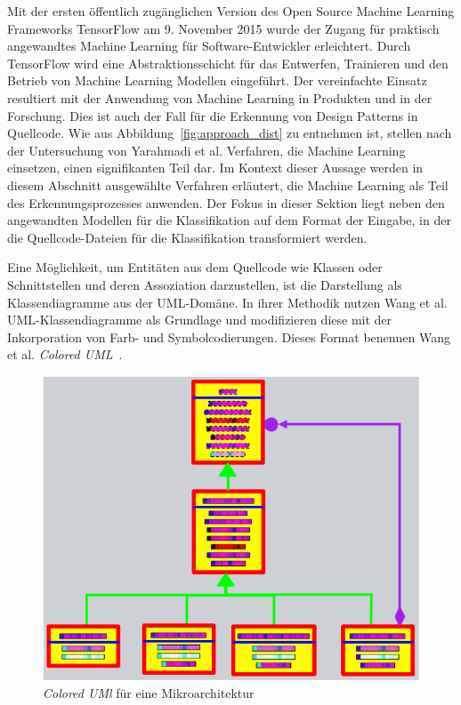 Mit der ersten öffentlich zugänglichen Version des Open Source Machine Learning Frameworks TensorFlow am 9. November 2015 wurde der Zugang für praktisch angewandtes Machine Learning für Software-Entwickler erleichtert. Durch TensorFlow wird eine Abstraktionsschicht für das Entwerfen, Trainieren und den Betrieb von Machine Learning Modellen eingeführt. Der vereinfachte Einsatz resultiert mit der Anwendung von Machine Learning in Produkten und in der Forschung. Dies ist auch der Fall für die Erkennung von Design Patterns in Quellcode.
Wie aus Abbildung~\ref{fig:approach_dist} zu entnehmen ist, stellen nach der Untersuchung von Yarahmadi et al. Verfahren, die Machine Learning einsetzen, einen signifikanten Teil dar.
Im Kontext dieser Aussage werden in diesem Abschnitt ausgewählte Verfahren erläutert, die Machine Learning als Teil des Erkennungsprozesses anwenden.
Der Fokus in dieser Sektion liegt neben den angewandten Modellen für die Klassifikation auf dem Format der Eingabe, in der die Quellcode-Dateien für die Klassifikation transformiert werden.

Eine Möglichkeit, um Entitäten aus dem Quellcode wie Klassen oder Schnittstellen und deren Assoziation darzustellen, ist die Darstellung als Klassendiagramme aus der UML-Domäne.
In ihrer Methodik nutzen Wang et al. UML-Klassendiagramme als Grundlage und modifizieren diese mit der Inkorporation von Farb- und Symbolcodierungen. Dieses Format benennen Wang et al. \textit{Colored UML}~\cite[S. 6]{app12178718}.

\begin{figure}[h]
    \centering
    \includegraphics[scale=0.75]{figures/colored_uml.png}
    \caption{\textit{Colored UMl} für eine Mikroarchitektur}
    \label{fig:colored_uml}
\end{figure}


